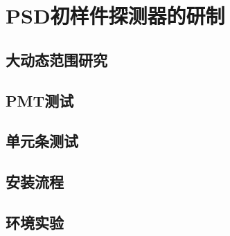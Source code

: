 \chapter{PSD初样件探测器的研制}

\section{大动态范围研究}

\section{PMT测试}

\section{单元条测试}

\section{安装流程}

\section{环境实验}